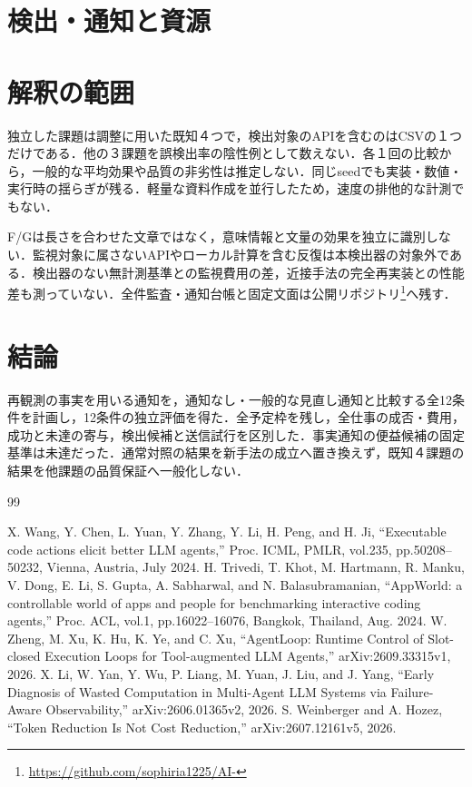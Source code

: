 \documentclass[uplatex,a4paper,twocolumn,10pt]{jsarticle}
\begin{document}
\section{検出・通知と資源}



\section{解釈の範囲}
独立した課題は調整に用いた既知４つで，検出対象のAPIを含むのはCSVの１つだけである．他の３課題を誤検出率の陰性例として数えない．各１回の比較から，一般的な平均効果や品質の非劣性は推定しない．同じseedでも実装・数値・実行時の揺らぎが残る．軽量な資料作成を並行したため，速度の排他的な計測でもない．

F/Gは長さを合わせた文章ではなく，意味情報と文量の効果を独立に識別しない．監視対象に属さないAPIやローカル計算を含む反復は本検出器の対象外である．検出器のない無計測基準との監視費用の差，近接手法の完全再実装との性能差も測っていない．全件監査・通知台帳と固定文面は公開リポジトリ\footnote{\url{https://github.com/sophiria1225/AI-}}へ残す．

\section{結論}
再観測の事実を用いる通知を，通知なし・一般的な見直し通知と比較する全12条件を計画し，12条件の独立評価を得た．全予定枠を残し，全仕事の成否・費用，成功と未達の寄与，検出候補と送信試行を区別した．事実通知の便益候補の固定基準は未達だった．通常対照の結果を新手法の成立へ置き換えず，既知４課題の結果を他課題の品質保証へ一般化しない．

\begin{thebibliography}{99}
\raggedright
{} X. Wang, Y. Chen, L. Yuan, Y. Zhang, Y. Li, H. Peng, and H. Ji, ``Executable code actions elicit better LLM agents,'' Proc. ICML, PMLR, vol.235, pp.50208--50232, Vienna, Austria, July 2024.
 H. Trivedi, T. Khot, M. Hartmann, R. Manku, V. Dong, E. Li, S. Gupta, A. Sabharwal, and N. Balasubramanian, ``AppWorld: a controllable world of apps and people for benchmarking interactive coding agents,'' Proc. ACL, vol.1, pp.16022--16076, Bangkok, Thailand, Aug. 2024.
 W. Zheng, M. Xu, K. Hu, K. Ye, and C. Xu, ``AgentLoop: Runtime Control of Slot-closed Execution Loops for Tool-augmented LLM Agents,'' arXiv:2609.33315v1, 2026.
 X. Li, W. Yan, Y. Wu, P. Liang, M. Yuan, J. Liu, and J. Yang, ``Early Diagnosis of Wasted Computation in Multi-Agent LLM Systems via Failure-Aware Observability,'' arXiv:2606.01365v2, 2026.
 S. Weinberger and A. Hozez, ``Token Reduction Is Not Cost Reduction,'' arXiv:2607.12161v5, 2026.
\end{thebibliography}
\end{document}
